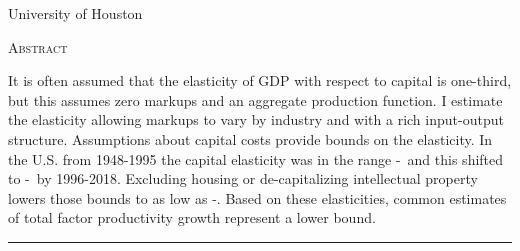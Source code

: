\documentclass[11pt]{article}
\begin{document}
\begin{titlepage}
\vspace{2in} \noindent {\large \today}

\vspace{.5in} 

\vspace{.25in} 

\vspace{.05in} \noindent University of Houston

\vfill \noindent \textsc{Abstract} \hrulefill

\vspace{.05in} \noindent It is often assumed that the elasticity of GDP with respect to capital is one-third, but this assumes zero markups and an aggregate production function. I estimate the elasticity allowing markups to vary by industry and with a rich input-output structure. Assumptions about capital costs provide bounds on the elasticity. In the U.S. from 1948-1995 the capital elasticity was in the range \baseearlydepr-\baseearlynoprofit \ and this shifted to \baselatedepr-\baselatenoprofit \ by 1996-2018. Excluding housing or de-capitalizing intellectual property lowers those bounds to as low as \excldepr-\exclnoprofit. Based on these elasticities, common estimates of total factor productivity growth represent a lower bound. 

\vspace{.1in} \hrule

\vspace{.5in} 

\vspace{.1in} 

\vspace{.1in} 
\end{titlepage}

\pagebreak 
\end{document}
